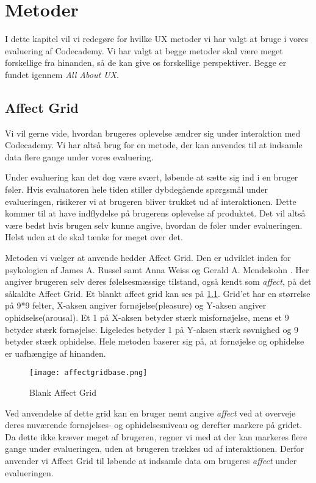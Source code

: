 \chapter{Metoder}\label{ch:met}
I dette kapitel vil vi redegøre for hvilke UX metoder vi har valgt at bruge i vores evaluering af Codecademy. Vi har valgt at begge metoder skal være meget forskellige fra hinanden, så de kan give os forskellige perspektiver. Begge er fundet igennem \textit{All About UX}\cite{AllAboutUX}.


\section{Affect Grid}\label{sec:AG}
Vi vil gerne vide, hvordan brugeres oplevelse ændrer sig under interaktion med Codecademy. Vi har altså brug for en metode, der kan anvendes til at indsamle data flere gange under vores evaluering. 

Under evaluering kan det dog være svært, løbende at sætte sig ind i en bruger føler. Hvis evaluatoren hele tiden stiller dybdegående spørgsmål under evalueringen, risikerer vi at brugeren bliver trukket ud af interaktionen. Dette kommer til at have indflydelse på brugerens oplevelse af produktet. Det vil altså være bedst hvis brugen selv kunne angive, hvordan de føler under evalueringen. Helst uden at de skal tænke for meget over det. 

Metoden vi vælger at anvende hedder Affect Grid. Den er udviklet inden for psykologien af James A. Russel samt Anna Weiss og Gerald A. Mendelsohn \cite{AffectGrid}. Her angiver brugeren selv deres følelsesmæssige tilstand, også kendt som \textit{affect}, på det såkaldte Affect Grid. Et blankt affect grid kan ses på \cref{fig:affectgrid}. Grid'et har en størrelse på 9*9 felter, X-aksen angiver fornøjelse(pleasure) og Y-aksen angiver ophidselse(arousal). Et 1 på X-aksen betyder stærk misfornøjelse, mens et 9 betyder stærk fornøjelse. Ligeledes betyder 1 på Y-aksen stærk søvnighed og 9 betyder stærk ophidelse. Hele metoden baserer sig på, at fornøjelse og ophidelse er uafhængige af hinanden. 

\begin{figure}[h]
\centering
\texttt{[image: affectgridbase.png]}
\caption{Blank Affect Grid}
\label{fig:affectgrid}
\end{figure}

Ved anvendelse af dette grid kan en bruger nemt angive \textit{affect} ved at overveje deres nuværende fornøjelses- og ophidelsesniveau og derefter markere på gridet. Da dette ikke kræver meget af brugeren, regner vi med at der kan markeres flere gange under evalueringen, uden at brugeren trækkes ud af interaktionen. Derfor anvender vi Affect Grid til løbende at indsamle data om brugeres \textit{affect} under evalueringen.


